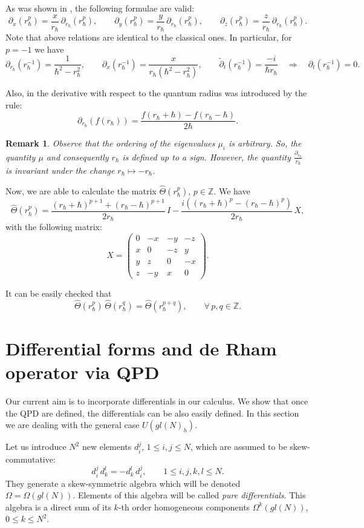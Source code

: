 \documentclass[10pt,a4paper]{amsart}
\newcommand{\pa}{\partial}
\newcommand{\tpa}{\widetilde{\pa}}
\newcommand{\hh}{\hbar}
\newcommand{\hatt}{\widehat{\Theta}}
\newcommand{\rh}{r_{\hbar}}
\newcommand{\parh}{\pa_{\rh}}
\newcommand{\Om}{\Omega}
\numberwithin{equation}{section}
\newtheorem{remark}[theorem]{Remark}
\begin{document}
As was shown in \cite{GS2}, the following formulae are valid:
\begin{equation}
\pa_x(\rh^p)=\frac{x}{\rh}\,\parh(\rh^p), \qquad \pa_y(\rh^p)=\frac{y}{\rh}\,\parh(\rh^p),\qquad  \pa_z(\rh^p)=\frac{z}{\rh}\,\parh(\rh^p).
\label{ppp}
\end{equation}
Note that above relations are identical to the classical ones. In particular, for $p=-1$ we have
\[
\parh(\rh^{-1})=\frac{1}{\hh^2-\rh^2},\qquad \pa_x(\rh^{-1})=\frac{x}{\rh(\hh^2-\rh^2)},\qquad
\tpa_t(\rh^{-1})=\frac{-i}{\hh \rh}\quad\Rightarrow\quad \partial_t(\rh^{-1}) = 0.
\]

Also, in \cite{GS2} the derivative with respect to the quantum radius was introduced by the rule:
\[
\parh(f(\rh))=\frac{f(\rh+\hh)-f(\rh-\hh)}{2\hh}.
\]
\begin{remark}
Observe that the ordering of the eigenvalues $\mu_i$ is arbitrary. So, the quantity $\mu$ and consequently $\rh$ is defined up
to a sign. However, the	quantity $\frac{\pa_{\rh}}{\rh}$ is invariant under the change $\rh\mapsto -\rh$.
\end{remark}

Now, we are able to calculate the matrix $\hatt(\rh^p)$, $p \in \mathbb{Z}$. We have
\begin{equation}
\hatt(\rh^p)=\frac{(\rh+\hh)^{p+1}+(\rh-\hh)^{p+1}}{2\rh}\, I-\frac{i((\rh+\hh)^{p}-(\rh-\hh)^{p})}{2\rh}\, X,
\label{ten}
\end{equation}
with the following matrix:
\[
X=
\left(\!\!
\begin{array}{cccc}
	0 & -x\,&-y&-z\\
	x& 0 &-z&y\\
	y& z & 0 & -x\\
	z&-y&  x& 0
\end{array}
\!\!\right).
\]

It can be easily checked that
\[
\hatt(\rh^p)\,\hatt(\rh^q)=\hatt(\rh^{p+q}),\qquad \forall\, p,q \in \mathbb{Z}.
\]

\section{Differential forms and de Rham operator via QPD}\label{sec:differential}

Our current aim is to incorporate  differentials in our calculus. We show that once the QPD are defined, the differentials can be also
easily defined. In this section we are dealing with the general case $U(gl(N)_h)$.

Let us introduce $N^2$ new elements $d_i^j$, $1\le i,j\le N$, which are assumed to be skew-com\-mu\-ta\-tive:
\[
d_i^j\, d_k^l=-d_k^l\, d_i^j,\qquad 1\leq i,j,k,l \leq N.
\]
They generate a skew-symmetric algebra which will be denoted $\Om=\Om(gl(N))$. Elements of this algebra will be called
{\em pure differentials}. This algebra is a direct sum of its $k$-th order homogeneous components $\Om^k(gl(N))$, $0\le k\le N^2$.
\end{document}
